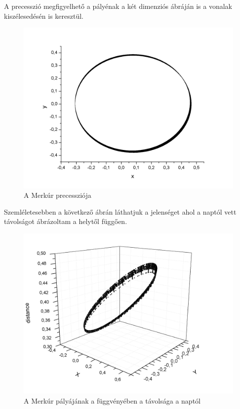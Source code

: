 \documentclass[paper=a4, fontsize=11pt]{article}
\begin{document}
A precesszió megfigyelhető a pályénak a két dimenziós ábráján is a vonalak kiszélesedésén is keresztül.
\begin{figure}[H]
  \includegraphics[width=\textwidth]{merkur}
\caption{A Merkúr precessziója}
\end{figure}

Szemléletesebben a következő ábrán láthatjuk a jelenséget ahol a naptól vett távolságot ábrázoltam a helytől függően.
\begin{figure}[H]
  \includegraphics[width=\textwidth]{merkur3d}
\caption{A Merkúr pályájának a függvényében a távolsága a naptól}
\end{figure}
\end{document}
